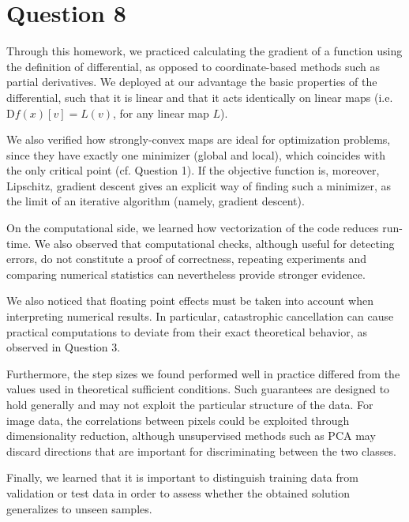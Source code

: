 \documentclass{article}
\theoremstyle{definition}
\theoremstyle{remark}
\newcommand{\D}{\mathrm D}
\begin{document}
\section*{Question 8}
Through this homework, we practiced calculating the gradient of a function using the definition of differential, as opposed to coordinate-based methods such as partial derivatives. We deployed at our advantage the basic properties of the differential, such that it is linear and that it acts identically on linear maps (i.e. $\D f(x)[v]=L(v)$, for any linear map $L$).

We also verified how strongly-convex maps are ideal for optimization problems, since they have exactly one minimizer (global and local), which coincides with the only critical point (cf. Question 1). If the objective function is, moreover, Lipschitz, gradient descent gives an explicit way of finding such a minimizer, as the limit of an iterative algorithm (namely, gradient descent).

On the computational side, we learned how vectorization of the code reduces run-time. We also observed that computational checks, although useful for detecting errors, do not constitute a proof of correctness, repeating experiments and comparing numerical statistics can nevertheless provide stronger evidence.

We also noticed that floating point effects must be taken into account when interpreting numerical results. In particular, catastrophic cancellation can cause practical computations to deviate from their exact theoretical behavior, as observed in Question 3.

Furthermore, the step sizes we found performed well in practice differed from the values used in theoretical sufficient conditions. Such guarantees are designed to hold generally and may not exploit the particular structure of the data. For image data, the correlations between pixels could be exploited through dimensionality reduction, although unsupervised methods such as PCA may discard directions that are important for discriminating between the two classes.

Finally, we learned that it is important to distinguish training data from validation or test data in order to assess whether the obtained solution generalizes to unseen samples.
\end{document}
